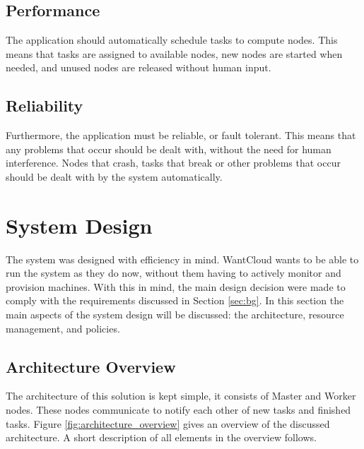 \documentclass{acm_proc_article-sp}
\begin{document}
\subsection{Performance}
The application should automatically schedule tasks to compute nodes.
This means that tasks are assigned to available nodes, new nodes are started when needed, and unused nodes are released without human input.

\subsection{Reliability}
Furthermore, the application must be reliable, or fault tolerant.
This means that any problems that occur should be dealt with, without the need for human interference.
Nodes that crash, tasks that break or other problems that occur should be dealt with by the system automatically.

\section{System Design}
\label{sec:system}
The system was designed with efficiency in mind.
WantCloud wants to be able to run the system as they do now, without them having to actively monitor and provision machines.
With this in mind, the main design decision were made to comply with the requirements discussed in Section \ref{sec:bg}.
In this section the main aspects of the system design will be discussed: the architecture, resource management, and policies.

\subsection{Architecture Overview}
The architecture of this solution is kept simple, it consists of Master and Worker nodes.
These nodes communicate to notify each other of new tasks and finished tasks.
Figure \ref{fig:architecture_overview} gives an overview of the discussed architecture.
A short description of all elements in the overview follows.
\end{document}
